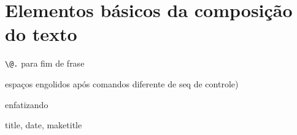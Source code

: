 \section{Elementos básicos da composição do texto}

\verb!\@.! para fim de frase


espaços engolidos após comandos diferente de seq de controle)

enfatizando

title, date, maketitle

